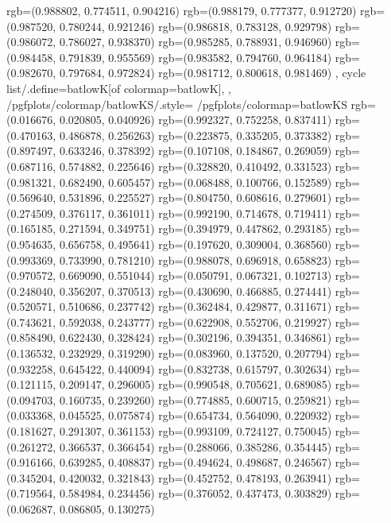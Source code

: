 {{{					rgb=(0.988802, 0.774511, 0.904216)
					rgb=(0.988179, 0.777377, 0.912720)
					rgb=(0.987520, 0.780244, 0.921246)
					rgb=(0.986818, 0.783128, 0.929798)
					rgb=(0.986072, 0.786027, 0.938370)
					rgb=(0.985285, 0.788931, 0.946960)
					rgb=(0.984458, 0.791839, 0.955569)
					rgb=(0.983582, 0.794760, 0.964184)
					rgb=(0.982670, 0.797684, 0.972824)
					rgb=(0.981712, 0.800618, 0.981469)
			},
		cycle list/.define={batlowK}{[of colormap=batlowK]},
		},
		/pgfplots/colormap/batlowKS/.style={
			/pgfplots/colormap={batlowKS}{%
					rgb=(0.016676, 0.020805, 0.040926)
					rgb=(0.992327, 0.752258, 0.837411)
					rgb=(0.470163, 0.486878, 0.256263)
					rgb=(0.223875, 0.335205, 0.373382)
					rgb=(0.897497, 0.633246, 0.378392)
					rgb=(0.107108, 0.184867, 0.269059)
					rgb=(0.687116, 0.574882, 0.225646)
					rgb=(0.328820, 0.410492, 0.331523)
					rgb=(0.981321, 0.682490, 0.605457)
					rgb=(0.068488, 0.100766, 0.152589)
					rgb=(0.569640, 0.531896, 0.225527)
					rgb=(0.804750, 0.608616, 0.279601)
					rgb=(0.274509, 0.376117, 0.361011)
					rgb=(0.992190, 0.714678, 0.719411)
					rgb=(0.165185, 0.271594, 0.349751)
					rgb=(0.394979, 0.447862, 0.293185)
					rgb=(0.954635, 0.656758, 0.495641)
					rgb=(0.197620, 0.309004, 0.368560)
					rgb=(0.993369, 0.733990, 0.781210)
					rgb=(0.988078, 0.696918, 0.658823)
					rgb=(0.970572, 0.669090, 0.551044)
					rgb=(0.050791, 0.067321, 0.102713)
					rgb=(0.248040, 0.356207, 0.370513)
					rgb=(0.430690, 0.466885, 0.274441)
					rgb=(0.520571, 0.510686, 0.237742)
					rgb=(0.362484, 0.429877, 0.311671)
					rgb=(0.743621, 0.592038, 0.243777)
					rgb=(0.622908, 0.552706, 0.219927)
					rgb=(0.858490, 0.622430, 0.328424)
					rgb=(0.302196, 0.394351, 0.346861)
					rgb=(0.136532, 0.232929, 0.319290)
					rgb=(0.083960, 0.137520, 0.207794)
					rgb=(0.932258, 0.645422, 0.440094)
					rgb=(0.832738, 0.615797, 0.302634)
					rgb=(0.121115, 0.209147, 0.296005)
					rgb=(0.990548, 0.705621, 0.689085)
					rgb=(0.094703, 0.160735, 0.239260)
					rgb=(0.774885, 0.600715, 0.259821)
					rgb=(0.033368, 0.045525, 0.075874)
					rgb=(0.654734, 0.564090, 0.220932)
					rgb=(0.181627, 0.291307, 0.361153)
					rgb=(0.993109, 0.724127, 0.750045)
					rgb=(0.261272, 0.366537, 0.366454)
					rgb=(0.288066, 0.385286, 0.354445)
					rgb=(0.916166, 0.639285, 0.408837)
					rgb=(0.494624, 0.498687, 0.246567)
					rgb=(0.345204, 0.420032, 0.321843)
					rgb=(0.452752, 0.478193, 0.263941)
					rgb=(0.719564, 0.584984, 0.234456)
					rgb=(0.376052, 0.437473, 0.303829)
					rgb=(0.062687, 0.086805, 0.130275)
}}}
